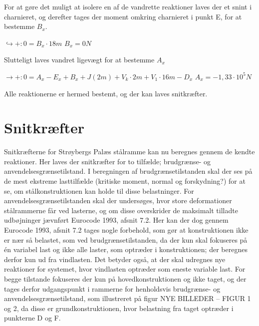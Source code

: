 For at gøre det muligt at isolere en af de vandrette reaktioner laves der et snint i charnieret, og derefter tages der moment omkring charnieret i punkt E, for at bestemme $B_x$.
\begin{center}
	$\hookrightarrow+: 0 = B_x \cdot 18m$
	\newline
	$B_x = 0N$
\end{center}

Slutteligt laves vandret ligevægt for at bestemme $A_x$
\begin{center}
	$\rightarrow+: 0 = A_x - E_x + B_x + J(2m) + V_k \cdot 2m + V_1 \cdot 16 m - D_x$
	\newline
	$A_x = -1,\!33 \cdot 10^5N$
\end{center} 

Alle reaktionerne er hermed bestemt, og der kan laves snitkræfter.

\section{Snitkræfter}
Snitkræfterne for Strøybergs Palæs stålramme kan nu beregnes gennem de kendte reaktioner. Her laves der snitkræfter for to tilfælde; brudgrænse- og anvendelsesgrænsetilstand. I beregningen af brudgrænsetilstanden skal der ses på de mest ekstreme lasttilfælde (kritiske moment, normal og forskydning?) for at se, om stålkonstruktionen kan holde til disse belastninger. For anvendelsesgrænsetilstanden skal der undersøges, hvor store deformationer stålrammerne får ved lasterne, og om disse overskrider de maksimalt tilladte udbøjninger jævnført Eurocode 1993, afsnit 7.2. Her kan der dog gennem Eurocode 1993, afsnit 7.2 tages nogle forbehold, som gør at konstruktionen ikke er nær så belastet, som ved brudgrænsetilstanden, da der kun skal fokuseres på én variabel last og ikke alle laster, som optræder i konstruktionen; der beregnes derfor kun ud fra vindlasten. Det betyder også, at der skal udregnes nye reaktioner for systemet, hvor vindlasten optræder som eneste variable last.
\newline
\newline
For begge tilstande fokuseres der kun på hovedkonstruktionen og ikke taget, og der tages derfor udgangspunkt i rammerne for henholdsvis brudgrænse- og anvendelsesgrænsetilstand, som illustreret på figur NYE BILLEDER – FIGUR 1 og 2, da disse er grundkonstruktionen, hvor belastning fra taget optræder i punkterne D og F.

